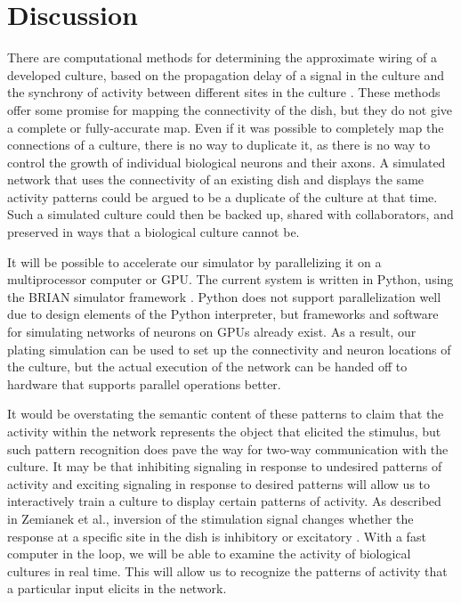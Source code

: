 \documentclass[letterpaper]{article}
\begin{document}
\section{Discussion}

There are computational methods for determining the approximate wiring of a developed culture, based on the propagation delay of a signal in the culture and the synchrony of activity between different sites in the culture  \cite{erickson2008caged,esposti2008estimation}. 
These methods offer some promise for mapping the connectivity of the dish, but they do not give a complete or fully-accurate map. 
Even if it was possible to completely map the connections of a culture, there is no way to duplicate it, as there is no way to control the growth of individual biological neurons and their axons. 
A simulated network that uses the connectivity of an existing dish and displays the same activity patterns could be argued to be a duplicate of the culture at that time. 
Such a simulated culture could then be backed up, shared with collaborators, and preserved in ways that a biological culture cannot be. 

It will be possible to accelerate our simulator by parallelizing it on a multiprocessor computer or GPU.
The current system is written in Python, using the BRIAN simulator framework \cite{goodman2008brian}. 
Python does not support parallelization well due to design elements of the Python interpreter, but frameworks and software for simulating networks of neurons on GPUs already exist. 
As a result, our plating simulation can be used to set up the connectivity and neuron locations of the culture, but the actual execution of the network can be handed off to hardware that supports parallel operations better. 

It would be overstating the semantic content of these patterns to claim that the activity within the network represents the object that elicited the stimulus, but such pattern recognition does pave the way for two-way communication with the culture.
It may be that inhibiting signaling in response to undesired patterns of activity and exciting signaling in response to desired patterns will allow us to interactively train a culture to display certain patterns of activity. 
As described in Zemianek et al., inversion of the stimulation signal changes whether the response at a specific site in the dish is inhibitory or excitatory .
With a fast computer in the loop, we will be able to examine the activity of biological cultures in real time. 
This will allow us to recognize the patterns of activity that a particular input elicits in the network. 

 


\end{document}
